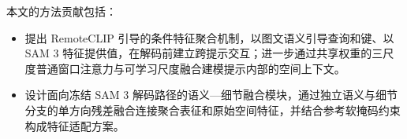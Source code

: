 本文的方法贡献包括：
\begin{itemize}
\item 提出 RemoteCLIP 引导的条件特征聚合机制，以图文语义引导查询和键、以 SAM 3 特征提供值，在解码前建立跨提示交互；进一步通过共享权重的三尺度普通窗口注意力与可学习尺度融合建模提示内部的空间上下文。
\item 设计面向冻结 SAM 3 解码路径的语义—细节融合模块，通过独立语义与细节分支的单方向残差融合连接聚合表征和原始空间特征，并结合参考软掩码约束构成特征适配方案。
\end{itemize}
